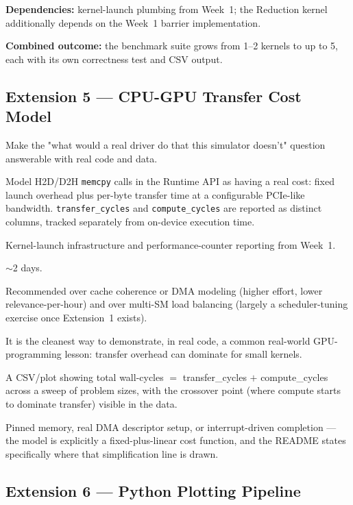 \documentclass[11pt]{article}
\begin{document}
\textbf{Dependencies:} kernel-launch plumbing from Week~1; the Reduction
kernel additionally depends on the Week~1 barrier implementation.

\textbf{Combined outcome:} the benchmark suite grows from 1--2 kernels to
up to 5, each with its own correctness test and CSV output.

\subsection{Extension 5 --- CPU-GPU Transfer Cost Model}

\begin{description}[leftmargin=1.2cm]
  \item[Purpose] Make the "what would a real driver do that this simulator
  doesn't" question answerable with real code and data.
  \item[Implementation] Model H2D/D2H \texttt{memcpy} calls in the Runtime
  API as having a real cost: fixed launch overhead plus per-byte transfer
  time at a configurable PCIe-like bandwidth. \texttt{transfer\_cycles} and
  \texttt{compute\_cycles} are reported as distinct columns, tracked
  separately from on-device execution time.
  \item[Dependencies] Kernel-launch infrastructure and performance-counter
  reporting from Week~1.
  \item[Estimated effort] $\sim$2 days.
  \item[Design notes] Recommended over cache coherence or DMA modeling
  (higher effort, lower relevance-per-hour) and over multi-SM load
  balancing (largely a scheduler-tuning exercise once Extension~1 exists).
  \item[Why it matters] It is the cleanest way to demonstrate, in real
  code, a common real-world GPU-programming lesson: transfer overhead can
  dominate for small kernels.
  \item[Proof of done] A CSV/plot showing total wall-cycles $=$
  transfer\_cycles $+$ compute\_cycles across a sweep of problem sizes,
  with the crossover point (where compute starts to dominate transfer)
  visible in the data.
  \item[Does not claim] Pinned memory, real DMA descriptor setup, or
  interrupt-driven completion --- the model is explicitly a fixed-plus-linear
  cost function, and the README states specifically where that
  simplification line is drawn.
\end{description}

\subsection{Extension 6 --- Python Plotting Pipeline}
\end{document}
